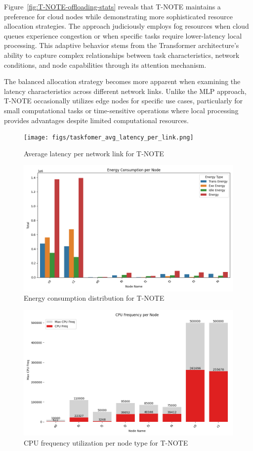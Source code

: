 \documentclass[preprint,12pt]{elsarticle}
\begin{document}
Figure~\ref{fig:T-NOTE-offloading-stats} reveals that T-NOTE maintains a preference for cloud nodes while demonstrating more sophisticated resource allocation strategies. The approach judiciously employs fog resources when cloud queues experience congestion or when specific tasks require lower-latency local processing. This adaptive behavior stems from the Transformer architecture's ability to capture complex relationships between task characteristics, network conditions, and node capabilities through its attention mechanism.

The balanced allocation strategy becomes more apparent when examining the latency characteristics across different network links. Unlike the MLP approach, T-NOTE occasionally utilizes edge nodes for specific use cases, particularly for small computational tasks or time-sensitive operations where local processing provides advantages despite limited computational resources.

\begin{figure}[H]
    \centering
    \texttt{[image: figs/taskfomer\_avg\_latency\_per\_link.png]}
    \caption{Average latency per network link for T-NOTE}
    \label{fig:T-NOTE-avg-latency}
\end{figure}

\begin{figure}[H]
    \centering
    \includegraphics[width=0.5\linewidth]{figs/taskformer_energy_consumption_per_node.png}
    \caption{Energy consumption distribution for T-NOTE}
    \label{fig:T-NOTE-energy-consumption}
\end{figure}

\begin{figure}[H]
    \centering
    \includegraphics[width=0.5\linewidth]{figs/taskformer_cpu_frequency_per_node.png}
    \caption{CPU frequency utilization per node type for T-NOTE}
    \label{fig:T-NOTE-cpu-frequency}
\end{figure}
\end{document}
